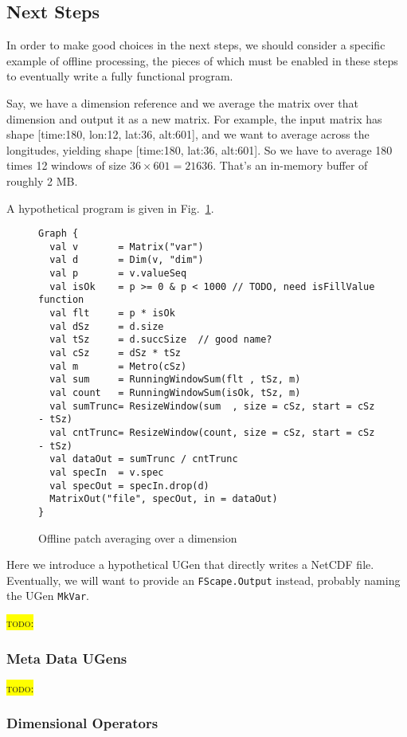 \documentclass[11pt,a4paper]{article}
\newcommand{\todo}[1]{\colorbox{yellow}{\textsc{todo}: #1}}
\newcommand{\figref}[1]{Fig.~\ref{#1}}
\begin{document}
\subsection{Next Steps}

In order to make good choices in the next steps, we should consider a specific example of offline processing, the pieces of which must be enabled in these steps to eventually write a fully functional program.

Say, we have a dimension reference and we average the matrix over that dimension and output it as a new matrix. For example, the input matrix has shape [time:180, lon:12, lat:36, alt:601], and we want to average across the longitudes, yielding shape [time:180, lat:36, alt:601]. So we have to average 180 times 12 windows of size $36 \times 601 = 21636$. That's an in-memory buffer of roughly 2 MB.

A hypothetical program is given in \figref{lst:averaging}.
%
\begin{figure}
\begin{lstlisting}[style=scala]
Graph {
  val v       = Matrix("var")
  val d       = Dim(v, "dim")
  val p       = v.valueSeq
  val isOk    = p >= 0 & p < 1000 // TODO, need isFillValue function
  val flt     = p * isOk
  val dSz     = d.size
  val tSz     = d.succSize  // good name?
  val cSz     = dSz * tSz
  val m       = Metro(cSz)
  val sum     = RunningWindowSum(flt , tSz, m)
  val count   = RunningWindowSum(isOk, tSz, m)
  val sumTrunc= ResizeWindow(sum  , size = cSz, start = cSz - tSz)
  val cntTrunc= ResizeWindow(count, size = cSz, start = cSz - tSz)
  val dataOut = sumTrunc / cntTrunc
  val specIn  = v.spec
  val specOut = specIn.drop(d)
  MatrixOut("file", specOut, in = dataOut)
}
\end{lstlisting}
\caption{Offline patch averaging over a dimension}
\label{lst:averaging}
\end{figure}

Here we introduce a hypothetical UGen that directly writes a NetCDF file. Eventually, we will want to provide an \Verb!FScape.Output! instead, probably naming the UGen \Verb!MkVar!.

\todo{}

\subsubsection{Meta Data UGens}

\todo{}

\subsubsection{Dimensional Operators}
\end{document}
